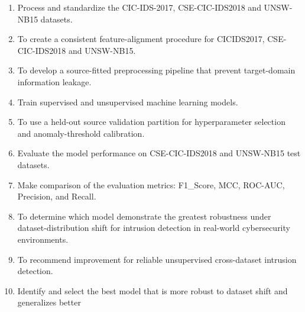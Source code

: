 \begin{enumerate}
    \item Process and standardize the CIC-IDS-2017, CSE-CIC-IDS2018 and UNSW-NB15 datasets.
    \item To create a consistent feature-alignment procedure for CICIDS2017, CSE-CIC-IDS2018 and UNSW-NB15.
    \item To develop a source-fitted preprocessing pipeline that prevent target-domain information leakage. 
    \item Train supervised and unsupervised machine learning models.
    \item To use a held-out source validation partition for hyperparameter selection and anomaly-threshold calibration.
    \item Evaluate the model performance on CSE-CIC-IDS2018 and UNSW-NB15 test datasets.
    \item Make comparison of the evaluation metrics: F1\_Score, MCC, ROC-AUC, Precision, and Recall.
    \item To determine which model demonstrate the greatest robustness under dataset-distribution shift for intrusion detection in real-world cybersecurity environments.
    \item To recommend improvement for reliable unsupervised cross-dataset intrusion detection.
    \item Identify and select the best model that is more robust to dataset shift and generalizes better 
\end{enumerate}
